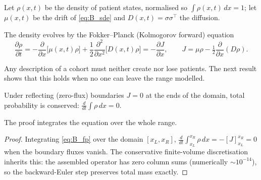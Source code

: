 \begin{definition}
\label{def:B_fp_terms}
Let $\rho(x,t)$ be the density of patient states, normalised so
$\int\rho(x,t)\,dx=1$; let $\mu(x,t)$ be the drift of \eqref{eq:B_sde} and
$D(x,t)=\sigma\sigma^\top$ the diffusion.
\end{definition}

The density evolves by the Fokker--Planck (Kolmogorov forward) equation \citep{risken_1996}
\begin{equation}
\frac{\partial\rho}{\partial t}
=-\frac{\partial}{\partial x}\big[\mu(x,t)\rho\big]
+\frac{1}{2}\frac{\partial^2}{\partial x^2}\big[D(x,t)\rho\big]
=-\frac{\partial J}{\partial x},\qquad
J=\mu\rho-\tfrac12\frac{\partial}{\partial x}(D\rho).
\label{eq:B_fp}
\end{equation}

Any description of a cohort must neither create nor lose patients. The next
result shows that this holds when no one can leave the range modelled.

\begin{proposition}
\label{prop:B_mass}
Under reflecting (zero-flux) boundaries $J=0$ at the ends of the domain, total
probability is conserved: $\tfrac{d}{dt}\int\rho\,dx=0$.
\end{proposition}
The proof integrates the equation over the whole range.
\begin{proof}
Integrating \eqref{eq:B_fp} over the domain $[x_L,x_R]$,
$\tfrac{d}{dt}\int_{x_L}^{x_R}\rho\,dx=-[J]_{x_L}^{x_R}=0$ when the boundary
fluxes vanish. The conservative finite-volume discretisation inherits this: the
assembled operator has zero column sums (numerically $\sim10^{-14}$), so the
backward-Euler step preserves total mass exactly.
\end{proof}

